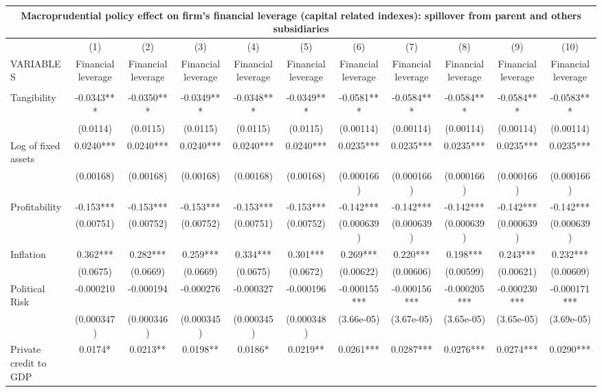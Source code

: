 \begin{tabular}{lcccccccccc}
\multicolumn{11}{c}{Macroprudential policy effect on firm's financial leverage (capital related indexes): spillover from parent and others subsidiaries} \\ \hline
 & (1) & (2) & (3) & (4) & (5) & (6) & (7) & (8) & (9) & (10) \\
VARIABLES & Financial leverage & Financial leverage & Financial leverage & Financial leverage & Financial leverage & Financial leverage & Financial leverage & Financial leverage & Financial leverage & Financial leverage \\ \hline
 &  &  &  &  &  &  &  &  &  &  \\
Tangibility & -0.0343*** & -0.0350*** & -0.0349*** & -0.0348*** & -0.0349*** & -0.0581*** & -0.0584*** & -0.0584*** & -0.0584*** & -0.0583*** \\
 & (0.0114) & (0.0115) & (0.0115) & (0.0115) & (0.0115) & (0.00114) & (0.00114) & (0.00114) & (0.00114) & (0.00114) \\
Log of fixed assets & 0.0240*** & 0.0240*** & 0.0240*** & 0.0240*** & 0.0240*** & 0.0235*** & 0.0235*** & 0.0235*** & 0.0235*** & 0.0235*** \\
 & (0.00168) & (0.00168) & (0.00168) & (0.00168) & (0.00168) & (0.000166) & (0.000166) & (0.000166) & (0.000166) & (0.000166) \\
Profitability & -0.153*** & -0.153*** & -0.153*** & -0.153*** & -0.153*** & -0.142*** & -0.142*** & -0.142*** & -0.142*** & -0.142*** \\
 & (0.00751) & (0.00752) & (0.00752) & (0.00751) & (0.00752) & (0.000639) & (0.000639) & (0.000639) & (0.000639) & (0.000639) \\
Inflation & 0.362*** & 0.282*** & 0.259*** & 0.334*** & 0.301*** & 0.269*** & 0.220*** & 0.198*** & 0.243*** & 0.232*** \\
 & (0.0675) & (0.0669) & (0.0669) & (0.0675) & (0.0672) & (0.00622) & (0.00606) & (0.00599) & (0.00621) & (0.00609) \\
Political Risk & -0.000210 & -0.000194 & -0.000276 & -0.000327 & -0.000196 & -0.000155*** & -0.000156*** & -0.000205*** & -0.000230*** & -0.000171*** \\
 & (0.000347) & (0.000346) & (0.000345) & (0.000345) & (0.000348) & (3.66e-05) & (3.67e-05) & (3.65e-05) & (3.65e-05) & (3.69e-05) \\
Private credit to GDP & 0.0174* & 0.0213** & 0.0198** & 0.0186* & 0.0219** & 0.0261*** & 0.0287*** & 0.0276*** & 0.0274*** & 0.0290*** \\

\end{tabular}
